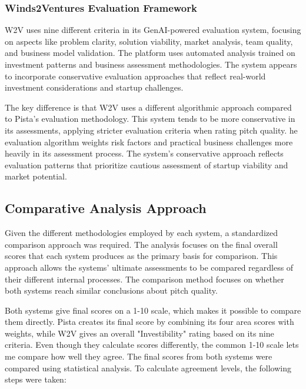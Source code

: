 \subsubsection{Winds2Ventures Evaluation Framework}

W2V uses nine different criteria in its GenAI-powered evaluation system, focusing on aspects like problem clarity, solution viability, market analysis, team quality, and business model validation. The platform uses automated analysis trained on investment patterns and business assessment methodologies. The system appears to incorporate conservative evaluation approaches that reflect real-world investment considerations and startup challenges.

The key difference is that W2V uses a different algorithmic approach compared to Pista's evaluation methodology. This system tends to be more conservative in its assessments, applying stricter evaluation criteria when rating pitch quality. he evaluation algorithm weights risk factors and practical business challenges more heavily in its assessment process. The system's conservative approach reflects evaluation patterns that prioritize cautious assessment of startup viability and market potential.

\subsection{Comparative Analysis Approach}
\label{subsec:methodology-approach}

Given the different methodologies employed by each system, a standardized comparison approach was required. The analysis focuses on the final overall scores that each system produces as the primary basis for comparison. This approach allows the systems' ultimate assessments to be compared regardless of their different internal processes. The comparison method focuses on whether both systems reach similar conclusions about pitch quality.

Both systems give final scores on a 1-10 scale, which makes it possible to compare them directly. Pista creates its final score by combining its four area scores with weights, while W2V gives an overall "Investibility" rating based on its nine criteria. Even though they calculate scores differently, the common 1-10 scale lets me compare how well they agree.
The final scores from both systems were compared using statistical analysis. 
To calculate agreement levels, the following steps were taken:

